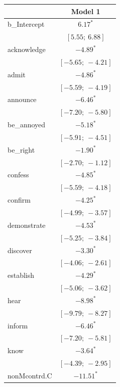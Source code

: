 \documentclass[11pt,fleqn]{article}
\newcommand{\6}{\mbox{$[\hspace*{-.6mm}[$}}
\newcommand{\9}{\mbox{$]\hspace*{-.6mm}]$}}
\begin{document}
{\begin{table}
\begin{center}
\begin{tabular}{l c }
\hline
 & Model 1 \\
\hline
b\_Intercept        & $6.17^{*}$          \\
                    & $[5.55;\ 6.88]$     \\
acknowledge  & $-4.89^{*}$         \\
                    & $[-5.65;\ -4.21]$   \\
admit        & $-4.86^{*}$         \\
                    & $[-5.59;\ -4.19]$   \\
announce     & $-6.46^{*}$         \\
                    & $[-7.20;\ -5.80]$   \\
be\_annoyed  & $-5.18^{*}$         \\
                    & $[-5.91;\ -4.51]$   \\
be\_right    & $-1.90^{*}$         \\
                    & $[-2.70;\ -1.12]$   \\
confess      & $-4.85^{*}$         \\
                    & $[-5.59;\ -4.18]$   \\
confirm      & $-4.25^{*}$         \\
                    & $[-4.99;\ -3.57]$   \\
demonstrate  & $-4.53^{*}$         \\
                    & $[-5.25;\ -3.84]$   \\
discover     & $-3.30^{*}$         \\
                    & $[-4.06;\ -2.61]$   \\
establish    & $-4.29^{*}$         \\
                    & $[-5.06;\ -3.62]$   \\
hear         & $-8.98^{*}$         \\
                    & $[-9.79;\ -8.27]$   \\
inform       & $-6.46^{*}$         \\
                    & $[-7.20;\ -5.81]$   \\
know         & $-3.64^{*}$         \\
                    & $[-4.39;\ -2.95]$   \\
nonMcontrd.C & $-11.51^{*}$        \\

\end{tabular}
\end{center}
\end{table}}
\end{document}
